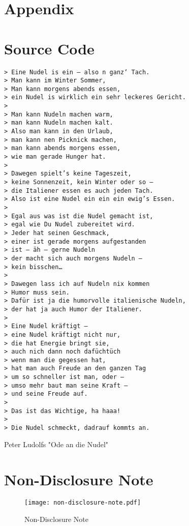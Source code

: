 \appendix
\section*{Appendix}
\appendixtoc
\clearpage

\newenvironment{longlisting}{\captionsetup{type=listing}}{}

\section{Source Code}

\vspace{1em}

\begin{longlisting}
\begin{verbatim}
> Eine Nudel is ein – also n ganz‘ Tach.
> Man kann im Winter Sommer,
> Man kann morgens abends essen,
> ein Nudel is wirklich ein sehr leckeres Gericht.
>
> Man kann Nudeln machen warm,
> man kann Nudeln machen kalt.
> Also man kann in den Urlaub,
> man kann nen Picknick machen,
> man kann abends morgens essen,
> wie man gerade Hunger hat.
>
> Dawegen spielt’s keine Tageszeit,
> keine Sonnenzeit, kein Winter oder so –
> die Italiener essen es auch jeden Tach.
> Also ist eine Nudel ein ein ein ewig’s Essen.
>
> Egal aus was ist die Nudel gemacht ist,
> egal wie Du Nudel zubereitet wird.
> Jeder hat seinen Geschmack,
> einer ist gerade morgens aufgestanden
> ist – äh – gerne Nudeln
> der macht sich auch morgens Nudeln –
> kein bisschen…
>
> Dawegen lass ich auf Nudeln nix kommen
> Humor muss sein.
> Dafür ist ja die humorvolle italienische Nudeln,
> der hat ja auch Humor der Italiener.
>
> Eine Nudel kräftigt –
> eine Nudel kräftigt nicht nur,
> die hat Energie bringt sie,
> auch nich dann noch dafüchtüch
> wenn man die gegessen hat,
> hat man auch Freude an den ganzen Tag
> um so schneller ist man, oder –
> umso mehr baut man seine Kraft –
> und seine Freude auf.
>
> Das ist das Wichtige, ha haaa!
>
> Die Nudel schmeckt, dadrauf kommts an.
\end{verbatim}
  \caption{Peter Ludolfs "Ode an die Nudel"}
  \label{lst:ludolf-nudel}
\end{longlisting}

\section{Non-Disclosure Note}

\begin{figure}[H]
  \centering
  \texttt{[image: non-disclosure-note.pdf]}
  \caption{Non-Disclosure Note}
  \label{fig:non-disclosure-note}
\end{figure}
